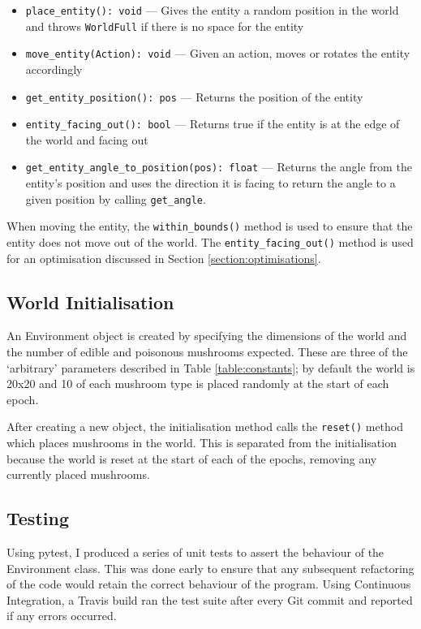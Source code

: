 \documentclass[12pt,a4paper,twoside,openright]{report}
\begin{document}
\begin{itemize}
	\item \texttt{place\_entity(): void} --- Gives the entity a random position in the world and throws \texttt{WorldFull} if there is no space for the entity
	\item \texttt{move\_entity(Action): void} --- Given an action, moves or rotates the entity accordingly
	\item \texttt{get\_entity\_position(): pos} --- Returns the position of the entity
	\item \texttt{entity\_facing\_out(): bool} --- Returns true if the entity is at the edge of the world and facing out
	\item \texttt{get\_entity\_angle\_to\_position(pos): float} --- Returns the angle from the entity's position and uses the direction it is facing to return the angle to a given position by calling \texttt{get\_angle}.
\end{itemize}

When moving the entity, the \texttt{within\_bounds()} method is used to ensure that the entity does not move out of the world. The \texttt{entity\_facing\_out()} method is used for an optimisation discussed in Section \ref{section:optimisations}.

\subsection{World Initialisation}

An Environment object is created by specifying the dimensions of the world and the number of edible and poisonous mushrooms expected. These are three of the `arbitrary' parameters described in Table \ref{table:constants}; by default the world is 20x20 and 10 of each mushroom type is placed randomly at the start of each epoch.

After creating a new object, the initialisation method calls the \texttt{reset()} method which places mushrooms in the world. This is separated from the initialisation because the world is reset at the start of each of the epochs, removing any currently placed mushrooms.

\subsection{Testing}

Using pytest, I produced a series of unit tests to assert the behaviour of the Environment class. This was done early to ensure that any subsequent refactoring of the code would retain the correct behaviour of the program. Using Continuous Integration, a Travis build ran the test suite after every Git commit and reported if any errors occurred.
\end{document}
